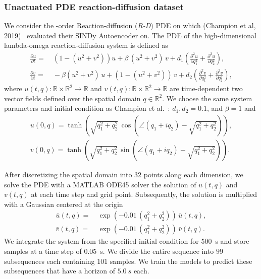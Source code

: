 \subsubsection{Unactuated PDE reaction-diffusion dataset}\label{ssub:con:reaction_diffusion_dataset}
 We consider the -order Reaction-diffusion (\emph{R-D}) \gls{PDE} on which (Champion et al, 2019)~\citep{champion2019data} evaluated their SINDy Autoencoder on. The \gls{PDE} of the high-dimensional lambda-omega reaction-diffusion system is defined as
\begin{equation}
\begin{split}
    \frac{\partial u}{\partial t} =& \: \left ( 1 - (u^2 + v^2) \right ) u + \beta \, (u^2 + v^2) \, v + d_1 \left ( \frac{\partial^2 u}{\partial q_1^2} + \frac{\partial^2 u}{\partial q_2^2} \right ),\\
    \frac{\partial v}{\partial t} =& \: -\beta (u^2 + v^2) \, u + (1 - (u^2 + v^2)) \, v + d_2 \left ( \frac{\partial^2 v}{\partial q_1^2} + \frac{\partial^2 v}{\partial q_2^2} \right ),
\end{split}
\end{equation}
where $u(t,q): \mathbb{R} \times \mathbb{R}^2 \to \mathbb{R}$ and $v(t,q): \mathbb{R} \times \mathbb{R}^2 \to \mathbb{R}$ are time-dependent two vector fields defined over the spatial domain $q \in \mathbb{R}^2$.
We choose the same system parameters and initial condition as Champion et al.~\citep{champion2019data}: $d_1, d_2 = 0.1$, and $\beta = 1$ and 
\begin{equation}
\begin{split}
    u(0,q) = \tanh \left ( \sqrt{q_1^2 + q_2^2} \, \cos \left ( \angle (q_1 + i q_2) - \sqrt{q_1^2 + q_2^2} \right ) \right ),\\
    v(0,q) = \tanh \left ( \sqrt{q_1^2 + q_2^2} \, \sin \left ( \angle (q_1 + i q_2) - \sqrt{q_1^2 + q_2^2} \right ) \right ).
\end{split}
\end{equation}

After discretizing the spatial domain into $32$ points along each dimension, we solve the \gls{PDE} with a MATLAB ODE45 solver the solution of $u(t,q)$ and $v(t,q)$ at each time step and grid point.
Subsequently, the solution is multiplied with a Gaussian centered at the origin~\citep{champion2019data}
\begin{equation}
\begin{split}
    \bar{u}(t,q) =& \: \exp(-0.01 \, (q_1^2 + q_2^2)) \, \bar{u}(t,q),\\
    \bar{v}(t,q) =& \: \exp(-0.01 \, (q_1^2 + q_2^2)) \, \bar{v}(t,q).
\end{split}
\end{equation}
We integrate the system from the specified initial condition for \SI{500}{s} and store samples at a time step of \SI{0.05}{s}. We divide the entire sequence into $99$ subsequences each containing $101$ samples. We train the models to predict these subsequences that have a horizon of $\SI{5.0}{s}$ each.

